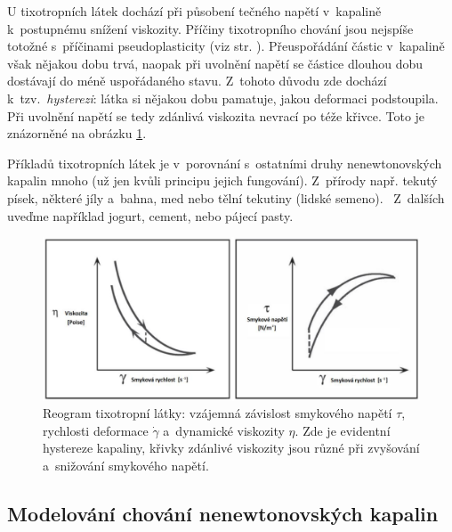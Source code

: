 \documentclass[12pt]{article}
\begin{document}
U tixotropních látek dochází při působení tečného napětí v~kapalině k~postupnému snížení viskozity. Příčiny tixotropního chování jsou nejspíše totožné s~příčinami pseudoplasticity (viz str. \pageref{sec:pseudoplasticita}). Přeuspořádání částic v~kapalině však nějakou dobu trvá, naopak při uvolnění napětí se částice dlouhou dobu dostávají do méně uspořádaného stavu. Z~tohoto důvodu zde dochází k~tzv.~\emph{hysterezi}: látka si nějakou dobu \glqq pamatuje\grqq, jakou deformaci podstoupila. Při uvolnění napětí se tedy zdánlivá viskozita nevrací po téže křivce. Toto je znázorněné na obrázku \ref{fig:tixotropni_kap}.~\cite{thesis:Viskozimetr_pro_viskozni_materialy}
\par
Příkladů tixotropních látek je v~porovnání s~ostatními druhy nenewtonovských kapalin mnoho (už jen kvůli principu jejich fungování). Z~přírody např. tekutý písek, některé jíly a~bahna, med nebo tělní tekutiny (lidské semeno).~\cite{wiki:Thixotropy} Z~dalších uveďme například jogurt, cement, nebo pájecí pasty.~\cite{Article:Thixotropy}\cite{Article:cement}\cite{thesis:Viskozimetr_pro_viskozni_materialy}\cite{wiki:Time-dependent_viscosity}

\begin{figure}
    \centering
    \includegraphics[width=\linewidth]{figures/tixotropni_hystereze.png}
    \caption{Reogram tixotropní látky: vzájemná závislost smykového napětí $\tau$, rychlosti deformace $\dot\gamma$ a~dynamické viskozity $\eta$. Zde je evidentní hystereze kapaliny, křivky zdánlivé viskozity jsou různé při zvyšování a~snižování smykového napětí.~\cite{thesis:Viskozimetr_pro_viskozni_materialy}}
    \label{fig:tixotropni_kap}
\end{figure}

\subsection{Modelování chování nenewtonovských kapalin}%
\end{document}
